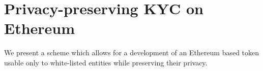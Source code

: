 \chapter{Privacy-preserving KYC on Ethereum}

\label{Chapter12_KYC}

We present a scheme which allows for a development of an Ethereum based token usable only to white-listed entities while preserving their privacy.